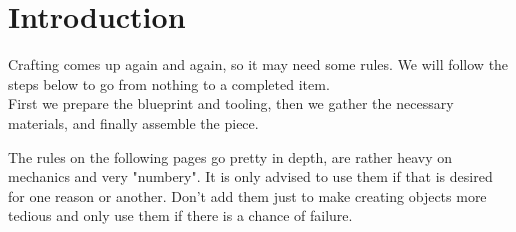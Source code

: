 \documentclass[12pt,a4paper,openany,usenames,dvipsnames]{book}
\begin{document}
	

	\chapter{Introduction}
	Crafting comes up again and again, so it may need some rules. We will follow the steps below to go from nothing to a completed item.\\
	First we prepare the blueprint and tooling, then we gather the necessary materials, and finally assemble the piece.
	\par
	\begin{exampleblock}
		The rules on the following pages go pretty in depth,
		are rather heavy on mechanics and very "numbery".
		It is only advised to use them if that is desired for one reason or another.
		Don't add them just to make creating objects more tedious
			and only use them if there is a chance of failure.
	\end{exampleblock}
\end{document}

